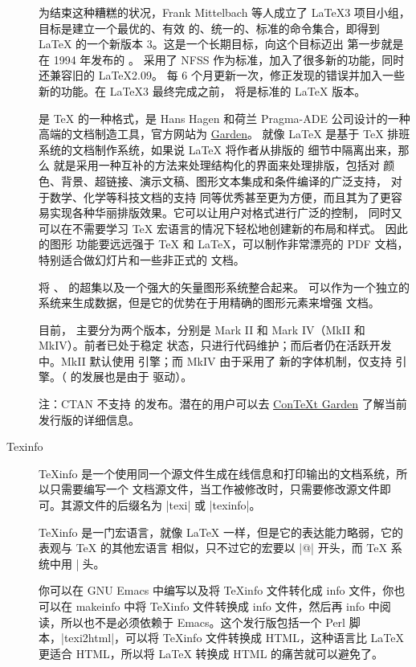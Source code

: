 \begin{description}
    为结束这种糟糕的状况，Frank Mittelbach 等人成立了 \LaTeX3 项目小组，目标是建立一个最优的、有效
    的、统一的、标准的命令集合，即得到 \LaTeX{} 的一个新版本 3。这是一个长期目标，向这个目标迈出
    第一步就是在 1994 年发布的 \LaTeXe{}。\LaTeXe{} 采用了 NFSS 作为标准，加入了很多新的功能，同时
    还兼容旧的 \LaTeX2.09。\LaTeXe{} 每 6 个月更新一次，修正发现的错误并加入一些新的功能。在
    \LaTeX3 最终完成之前，\LaTeXe{} 将是标准的 \LaTeX{} 版本。

  \item[\ConTeXt] \ConTeXt{} 是 \TeX{} 的一种格式，是 Hans Hagen 和荷兰 Pragma-ADE 公司设计的一种
    高端的文档制造工具，官方网站为 \href{http://wiki.contextgarden.net}{\ConTeXt{} Garden}。
    \ConTeXt{} 就像 \LaTeX{} 是基于 \TeX{} 排班系统的文档制作系统，如果说 \LaTeX{} 将作者从排版的
    细节中隔离出来，那么 \ConTeXt{} 就是采用一种互补的方法来处理结构化的界面来处理排版，包括对
    颜色、背景、超链接、演示文稿、图形文本集成和条件编译的广泛支持， 对于数学、化学等科技文档的支持
    同等优秀甚至更为方便，而且其为了更容易实现各种华丽排版效果。它可以让用户对格式进行广泛的控制，
    同时又可以在不需要学习 \TeX{} 宏语言的情况下轻松地创建新的布局和样式。 因此 \ConTeXt{} 的图形
    功能要远远强于 \TeX{} 和 \LaTeX{}，可以制作非常漂亮的 PDF 文档，特别适合做幻灯片和一些非正式的
    文档。

    \ConTeXt{} 将 \METAFONT{}、\METAPOST{} 的超集以及一个强大的矢量图形系统整合起来。\MetaFun{}
    可以作为一个独立的系统来生成数据，但是它的优势在于用精确的图形元素来增强 \ConTeXt{} 文档。

    目前，\ConTeXt{} 主要分为两个版本，分别是 Mark II 和 Mark IV（MkII 和 MkIV）。前者已处于稳定
    状态，只进行代码维护；而后者仍在活跃开发中。MkII 默认使用 \pdfTeX{} 引擎；而 MkIV 由于采用了
    新的字体机制，仅支持 \LuaTeX{} 引擎。（\LuaTeX{} 的发展也是由于 \ConTeXt{} 驱动）。

    注：CTAN 不支持 \ConTeXt{} 的发布。潜在的用户可以去
    \href{http://wiki.contextgarden.net/Main_Page}{ConTeXt Garden} 了解当前发行版的详细信息。

  \item[Texinfo] TeXinfo 是一个使用同一个源文件生成在线信息和打印输出的文档系统，所以只需要编写一个
    文档源文件，当工作被修改时，只需要修改源文件即可。其源文件的后缀名为 |texi| 或 |texinfo|。

    TeXinfo 是一门宏语言，就像 \LaTeX{} 一样，但是它的表达能力略弱，它的表观与 \TeX{} 的其他宏语言
    相似，只不过它的宏要以 |@| 开头，而 \TeX{} 系统中用 |\| 开头。

    你可以在 GNU Emacs 中编写以及将 TeXinfo 文件转化成 info 文件，你也可以在 makeinfo 中将 TeXinfo
    文件转换成 info 文件，然后再 info 中阅读，所以也不是必须依赖于 Emacs。这个发行版包括一个 Perl
    脚本，|texi2html|，可以将 TeXinfo 文件转换成 HTML，这种语言比 \LaTeX{} 更适合 HTML，所以将
    \LaTeX{} 转换成 HTML 的痛苦就可以避免了。


\end{description}
